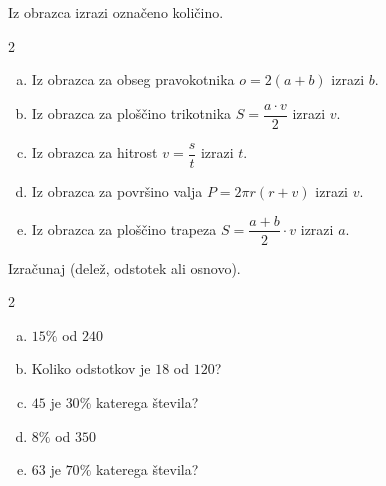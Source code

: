 \documentclass[a4paper,12pt]{letter}
\begin{document}
\begin{naloga}
Iz obrazca izrazi ozna\v{c}eno koli\v{c}ino.

\begin{multicols}{2}
\begin{enumerate}[a.)]
\item Iz obrazca za obseg pravokotnika $o=2(a+b)$ izrazi $b$.
\item Iz obrazca za plo\v{s}\v{c}ino trikotnika $S=\dfrac{a\cdot v}{2}$ izrazi $v$.
\item Iz obrazca za hitrost $v=\dfrac{s}{t}$ izrazi $t$.
\item Iz obrazca za povr\v{s}ino valja $P=2\pi r(r+v)$ izrazi $v$.
\item Iz obrazca za plo\v{s}\v{c}ino trapeza $S=\dfrac{a+b}{2}\cdot v$ izrazi $a$.
\end{enumerate}
\end{multicols}
\end{naloga}
\newpage

\begin{naloga}
Izra\v{c}unaj (dele\v{z}, odstotek ali osnovo).

\begin{multicols}{2}
\begin{enumerate}[a.)]
\item $15\%$ od $240$
\item Koliko odstotkov je $18$ od $120$?
\item $45$ je $30\%$ katerega \v{s}tevila?
\item $8\%$ od $350$
\item $63$ je $70\%$ katerega \v{s}tevila?
\end{enumerate}
\end{multicols}
\end{naloga}
\end{document}
